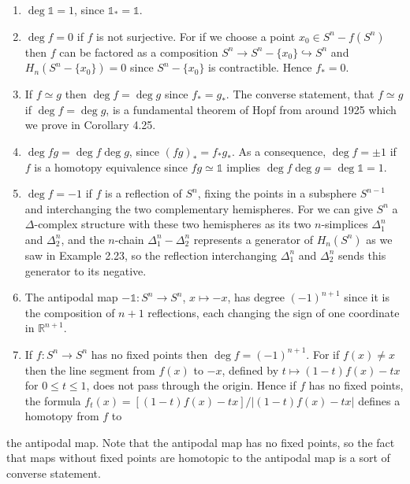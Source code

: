 \begin{enumerate}
\item[(a)] $\deg \mathbb{1} = 1$, since $\mathbb{1}_* = \mathbb{1}$.

\item[(b)] $\deg f = 0$ if $f$ is not surjective. For if we choose a point $x_0 \in S^n - f(S^n)$ then $f$ can be factored as a composition $S^n \to S^n - \{x_0\} \hookrightarrow S^n$ and $H_n(S^n - \{x_0\}) = 0$ since $S^n - \{x_0\}$ is contractible. Hence $f_* = 0$.

\item[(c)] If $f \simeq g$ then $\deg f = \deg g$ since $f_* = g_*$. The converse statement, that $f \simeq g$ if $\deg f = \deg g$, is a fundamental theorem of Hopf from around 1925 which we prove in Corollary 4.25.

\item[(d)] $\deg f g = \deg f \deg g$, since $(fg)_* = f_* g_*$. As a consequence, $\deg f = \pm 1$ if $f$ is a homotopy equivalence since $fg \simeq \mathbb{1}$ implies $\deg f \deg g = \deg \mathbb{1} = 1$.

\item[(e)] $\deg f = -1$ if $f$ is a reflection of $S^n$, fixing the points in a subsphere $S^{n-1}$ and interchanging the two complementary hemispheres. For we can give $S^n$ a $\Delta$-complex structure with these two hemispheres as its two $n$-simplices $\Delta_1^n$ and $\Delta_2^n$, and the $n$-chain $\Delta_1^n - \Delta_2^n$ represents a generator of $H_n(S^n)$ as we saw in Example 2.23, so the reflection interchanging $\Delta_1^n$ and $\Delta_2^n$ sends this generator to its negative.

\item[(f)] The antipodal map $-\mathbb{1} : S^n \to S^n$, $x \mapsto -x$, has degree $(-1)^{n+1}$ since it is the composition of $n+1$ reflections, each changing the sign of one coordinate in $\mathbb{R}^{n+1}$.

\item[(g)] If $f : S^n \to S^n$ has no fixed points then $\deg f = (-1)^{n+1}$. For if $f(x) \neq x$ then the line segment from $f(x)$ to $-x$, defined by $t \mapsto (1-t)f(x) - tx$ for $0 \le t \le 1$, does not pass through the origin. Hence if $f$ has no fixed points, the formula $f_t(x) = [(1-t)f(x) - tx]/|(1-t)f(x) - tx|$ defines a homotopy from $f$ to
\end{enumerate}

the antipodal map. Note that the antipodal map has no fixed points, so the fact that maps without fixed points are homotopic to the antipodal map is a sort of converse statement.

